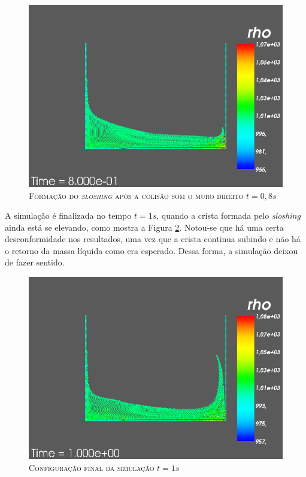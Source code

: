 \begin{figure}[H]
	\centering
	\includegraphics[scale=0.5]{figuras/pysph8s.png}
	\caption{\textsc{Formação do \textit{sloshing} após a colisão som o muro direito $t=0,8s$}}
	\vspace{-0.1cm}
	\label{fig:pysph8s}
\end{figure}

A simulação é finalizada no tempo $t=1s$, quando a crista formada pelo \textit{sloshing} ainda está se elevando, como mostra a Figura \ref{fig:pysphfim}. Notou-se que há uma certa desconformidade nos resultados, uma vez que a crista continua subindo e não há o retorno da massa líquida como  era esperado. Dessa forma, a simulação deixou de fazer sentido.

\begin{figure}[H]
	\centering
	\includegraphics[scale=0.5]{figuras/pysphfim.png}
	\caption{\textsc{Configuração final da simulação $t=1s$}}
	\vspace{-0.1cm}
	\label{fig:pysphfim}
\end{figure}


